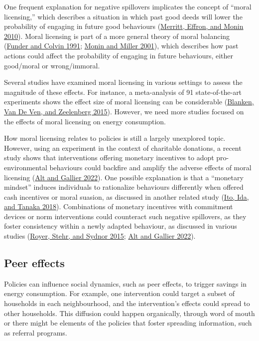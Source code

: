 \documentclass[
  11pt,
]{article}
\begin{document}
One frequent explanation for negative spillovers implicates the concept
of ``moral licensing,'' which describes a situation in which past good
deeds will lower the probability of engaging in future good behaviours
(\protect\hyperlink{ref-merritt2010moral}{Merritt, Effron, and Monin
2010}). Moral licensing is part of a more general theory of moral
balancing (\protect\hyperlink{ref-funder1991explorations}{Funder and
Colvin 1991}; \protect\hyperlink{ref-monin2001moral}{Monin and Miller
2001}), which describes how past actions could affect the probability of
engaging in future behaviours, either good/moral or wrong/immoral.

Several studies have examined moral licensing in various settings to
assess the magnitude of these effects. For instance, a meta-analysis of
91 state-of-the-art experiments shows the effect size of moral licensing
can be considerable (\protect\hyperlink{ref-blanken2015meta}{Blanken,
Van De Ven, and Zeelenberg 2015}). However, we need more studies focused
on the effects of moral licensing on energy consumption.

How moral licensing relates to policies is still a largely unexplored
topic. However, using an experiment in the context of charitable
donations, a recent study shows that interventions offering monetary
incentives to adopt pro-environmental behaviours could backfire and
amplify the adverse effects of moral licensing
(\protect\hyperlink{ref-alt2022incentives}{Alt and Gallier 2022}). One
possible explanation is that a ``monetary mindset'' induces individuals
to rationalize behaviours differently when offered cash incentives or
moral suasion, as discussed in another related study
(\protect\hyperlink{ref-ito2018moral}{Ito, Ida, and Tanaka 2018}).
Combinations of monetary incentives with commitment devices or norm
interventions could counteract such negative spillovers, as they foster
consistency within a newly adapted behaviour, as discussed in various
studies (\protect\hyperlink{ref-royer2015incentives}{Royer, Stehr, and
Sydnor 2015}; \protect\hyperlink{ref-alt2022incentives}{Alt and Gallier
2022}).

\hypertarget{peer-effects}{%
\subsection{Peer effects}\label{peer-effects}}

Policies can influence social dynamics, such as peer effects, to trigger
savings in energy consumption. For example, one intervention could
target a subset of households in each neighbourhood, and the
intervention's effects could spread to other households. This diffusion
could happen organically, through word of mouth or there might be
elements of the policies that foster spreading information, such as
referral programs.
\end{document}
